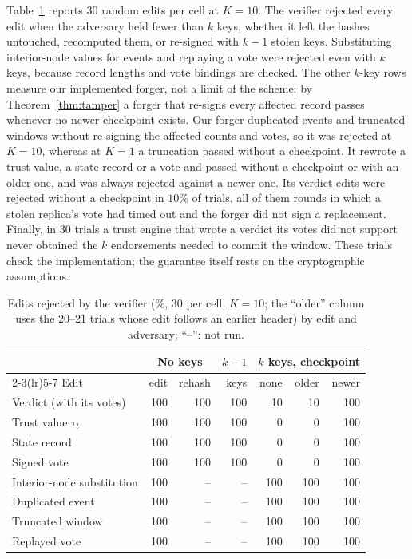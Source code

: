 \documentclass[lineno,pdflatex,sn-nature]{sn-jnl}
\theoremstyle{thmstyleone}%
\theoremstyle{thmstylethree}%
\begin{document}
Table~\ref{tab:tamper} reports $30$ random edits per cell at $K=10$.
The verifier rejected every edit when the adversary held fewer than
$k$ keys, whether it left the hashes untouched, recomputed them, or
re-signed with $k-1$ stolen keys.  Substituting interior-node values
for events and replaying a vote were rejected even with $k$ keys,
because record lengths and vote bindings are checked.  The other
$k$-key rows measure our implemented forger, not a limit of the
scheme: by Theorem~\ref{thm:tamper} a forger that re-signs every
affected record passes whenever no newer checkpoint exists.  Our
forger duplicated events and truncated windows without re-signing the
affected counts and votes, so it was rejected at $K=10$, whereas at
$K=1$ a truncation passed without a checkpoint.  It rewrote a trust
value, a state record or a vote and passed without a checkpoint or
with an older one, and was always rejected against a newer one.  Its
verdict edits were rejected without a checkpoint in $10\%$ of trials,
all of them rounds in which a stolen replica's vote had timed out and
the forger did not sign a replacement.  Finally, in $30$ trials a trust engine
that wrote a verdict its votes did not support never obtained the $k$
endorsements needed to commit the window.  These trials check the
implementation; the guarantee itself rests on the cryptographic
assumptions.

\begin{table}[!t]
\caption{Edits rejected by the verifier (\%, 30 per cell, $K=10$; the ``older'' column uses the 20--21 trials whose edit follows an earlier header) by edit and adversary; ``--'': not run.}
\label{tab:tamper}
\centering
\renewcommand{\arraystretch}{1.08}
\footnotesize
\setlength{\tabcolsep}{2.2pt}
\begin{tabular}{lrrrrrr}
\toprule
 & \multicolumn{2}{c}{{No keys}} & {$k{-}1$} & \multicolumn{3}{c}{{$k$ keys, checkpoint}} \\
\cmidrule(lr){2-3}\cmidrule(lr){5-7}
{Edit} & {edit} & {rehash} & {keys} & {none} & {older} & {newer} \\
\midrule
Verdict (with its votes) & 100 & 100 & 100 & 10 & 10 & 100 \\
Trust value $\tau_t$ & 100 & 100 & 100 & 0 & 0 & 100 \\
State record & 100 & 100 & 100 & 0 & 0 & 100 \\
Signed vote & 100 & 100 & 100 & 0 & 0 & 100 \\
Interior-node substitution & 100 & -- & -- & 100 & 100 & 100 \\
Duplicated event & 100 & -- & -- & 100 & 100 & 100 \\
Truncated window & 100 & -- & -- & 100 & 100 & 100 \\
Replayed vote & 100 & -- & -- & 100 & 100 & 100 \\
\bottomrule
\end{tabular}
\end{table}
\end{document}
